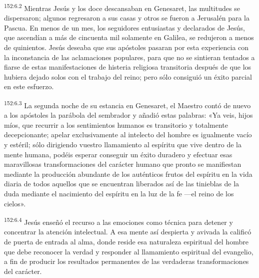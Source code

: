 \par
\textsuperscript{152:6.2} Mientras Jesús y los doce descansaban en Genesaret, las multitudes se dispersaron; algunos regresaron a sus casas y otros se fueron a Jerusalén para la Pascua. En menos de un mes, los seguidores entusiastas y declarados de Jesús, que ascendían a más de cincuenta mil solamente en Galilea, se redujeron a menos de quinientos. Jesús deseaba que sus apóstoles pasaran por esta experiencia con la inconstancia de las aclamaciones populares, para que no se sintieran tentados a fiarse de estas manifestaciones de histeria religiosa transitoria después de que los hubiera dejado solos con el trabajo del reino; pero sólo consiguió un éxito parcial en este esfuerzo.

\par
\textsuperscript{152:6.3} La segunda noche de su estancia en Genesaret, el Maestro contó de nuevo a los apóstoles la parábola del sembrador y añadió estas palabras: «Ya veis, hijos míos, que recurrir a los sentimientos humanos es transitorio y totalmente decepcionante; apelar exclusivamente al intelecto del hombre es igualmente vacío y estéril; sólo dirigiendo vuestro llamamiento al espíritu que vive dentro de la mente humana, podéis esperar conseguir un éxito duradero y efectuar esas maravillosas transformaciones del carácter humano que pronto se manifiestan mediante la producción abundante de los auténticos frutos del espíritu en la vida diaria de todos aquellos que se encuentran liberados así de las tinieblas de la duda mediante el nacimiento del espíritu en la luz de la fe ---el reino de los cielos».

\par
\textsuperscript{152:6.4} Jesús enseñó el recurso a las emociones como técnica para detener y concentrar la atención intelectual. A esa mente así despierta y avivada la calificó de puerta de entrada al alma, donde reside esa naturaleza espiritual del hombre que debe reconocer la verdad y responder al llamamiento espiritual del evangelio, a fin de producir los resultados permanentes de las verdaderas transformaciones del carácter.

